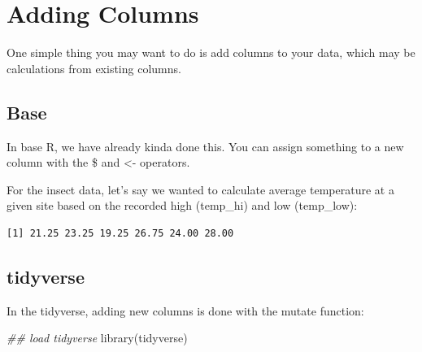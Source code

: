 \documentclass[
  letterpaper,
  DIV=11,
  numbers=noendperiod]{scrreprt}
\newenvironment{Shaded}{\begin{snugshade}}{\end{snugshade}}
\newcommand{\DecValTok}[1]{\textcolor[rgb]{0.68,0.00,0.00}{#1}}
\newcommand{\DocumentationTok}[1]{\textcolor[rgb]{0.37,0.37,0.37}{\textit{#1}}}
\newcommand{\FunctionTok}[1]{\textcolor[rgb]{0.28,0.35,0.67}{#1}}
\newcommand{\NormalTok}[1]{\textcolor[rgb]{0.00,0.23,0.31}{#1}}
\newcommand{\OtherTok}[1]{\textcolor[rgb]{0.00,0.23,0.31}{#1}}
\newcommand{\SpecialCharTok}[1]{\textcolor[rgb]{0.37,0.37,0.37}{#1}}
\begin{document}
\section{Adding Columns}\label{adding-columns}

One simple thing you may want to do is add columns to your data, which
may be calculations from existing columns.

\subsection{Base}\label{base}

In base R, we have already kinda done this. You can assign something to
a new column with the \$ and \textless- operators.

For the insect data, let's say we wanted to calculate average
temperature at a given site based on the recorded high (temp\_hi) and
low (temp\_low):

\begin{Shaded}
\end{Shaded}

\begin{verbatim}
[1] 21.25 23.25 19.25 26.75 24.00 28.00
\end{verbatim}

\subsection{tidyverse}\label{tidyverse}

In the tidyverse, adding new columns is done with the mutate function:

\begin{Shaded}
\begin{Highlighting}[]
\DocumentationTok{\#\# load tidyverse}
\FunctionTok{library}\NormalTok{(tidyverse)}
\end{Highlighting}
\end{Shaded}
\end{document}
